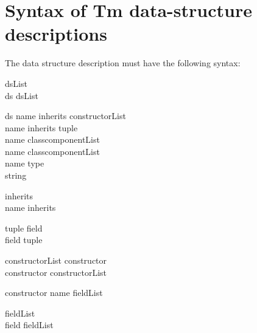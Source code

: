 \chapter{Syntax of Tm data-structure descriptions}
\label{s.dsgram}
The data structure description must have the following syntax:
\begin{production}{dsList}
\emptystring \\
ds dsList \\
\end{production}

\begin{production}{ds}
name \term{::=} inherits constructorList \term{;} \\
name \term{==} inherits \term{(} tuple \term{)} \term{;} \\
name \term{=} classcomponentList \term{;} \\
name \term{~=} classcomponentList \term{;} \\
name \term{->} type \term{;} \\
 string \term{;} \\
\end{production}

\begin{production}{inherits}
\emptystring \\
name \term{+} inherits \\
\end{production}

\begin{production}{tuple}
field \\
field \term{,} tuple \\
\end{production}

\begin{production}{constructorList}
constructor  \\
constructor \term{|} constructorList  \\
\end{production}

\begin{production}{constructor}
name fieldList \\
\end{production}

\begin{production}{fieldList}
\emptystring \\
field fieldList  \\
\end{production}


